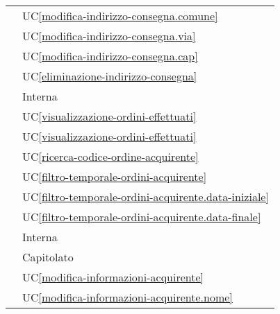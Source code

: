 \begin{longtable}{C{6cm} C{6cm}}
     & UC\ref{modifica-indirizzo-consegna.comune} \\

     & UC\ref{modifica-indirizzo-consegna.via} \\

     & UC\ref{modifica-indirizzo-consegna.cap} \\

     & UC\ref{eliminazione-indirizzo-consegna} \\

     & Interna \\

     & UC\ref{visualizzazione-ordini-effettuati} \\

     & UC\ref{visualizzazione-ordini-effettuati} \\

     & UC\ref{ricerca-codice-ordine-acquirente} \\

     & UC\ref{filtro-temporale-ordini-acquirente} \\

     & UC\ref{filtro-temporale-ordini-acquirente.data-iniziale} \\

     & UC\ref{filtro-temporale-ordini-acquirente.data-finale} \\

     & Interna \\

     & Capitolato \\

     & UC\ref{modifica-informazioni-acquirente} \\

     & UC\ref{modifica-informazioni-acquirente.nome} \\


\end{longtable}
